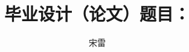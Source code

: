 \documentclass[cs4size, a4paer, cs4size, oneside, openany]{bitbs-xetex}
\begin{document}

\title{毕业设计（论文）题目：}
\author{宋\qquad 雷}

\maketitle

\frontmatter
{}
\tableofcontents

%

% 

\mainmatter




\appendix

\renewcommand\theequation{\Alph{chapter}--\arabic{equation}}
\renewcommand\thefigure{\Alph{chapter}--\arabic{figure}}
\renewcommand\thetable{\Alph{chapter}--\arabic{table}}

% 

\backmatter

{
}
%

%
\end{document}
